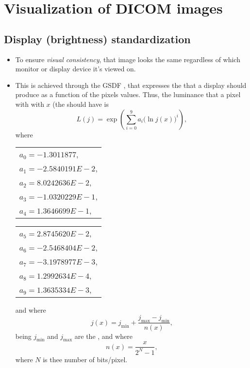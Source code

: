 \chapter{Visualization of \gls{DICOM} images}

\section{Display (brightness) standardization}
\begin{itemize}
\item To ensure \emph{visual consistency}, that image looks the same
  regardless of which monitor or display device it's viewed on.
\item This is achieved through the \gls{GSDF} \cite{DICOM_GSDF}, that
  expresses the  that a display
  should produce as a function of the pixels values. Thus, the
  luminance that a pixel with with  $x$ (the should have is
  \begin{equation}
    L(j) = \exp\left(\sum_{i=0}^{9}a_i\big(\ln j(x)\big)^i\right),
  \end{equation}
  where
  \begin{center}
  \begin{tabular}{l}
    $a_0 = -1.3011877$, \\
    $a_1 = -2.5840191E-2$, \\
    $a_2 = 8.0242636E-2$, \\
    $a_3 = -1.0320229E-1$, \\
    $a_4 = 1.3646699E-1$, \\
  \end{tabular}
  \begin{tabular}{l}
    $a_5 = 2.8745620E-2$, \\
    $a_6 = -2.5468404E-2$,\\
    $a_7 = -3.1978977E-3$, \\
    $a_8 = 1.2992634E-4$, \\
    $a_9 = 1.3635334E-3$,
  \end{tabular}
  \end{center}
  and where
  \begin{equation}
    j(x) = j_{\text{min}} + \frac{j_{\text{max}} - j_{\text{min}}}{n(x)},
  \end{equation}
  being $j_{\text{min}}$ and $j_{\text{max}}$ are the , and where
  \begin{equation}
    n(x) = \frac{x}{2^N-1},
  \end{equation}
  where $N$ is thee number of bits/pixel.
\end{itemize}

